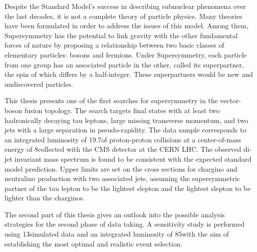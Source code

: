 Despite the Standard Model's success in describing subnuclear phenomena over the last decades, it is not a complete theory of particle physics. Many theories have been formulated in order to address the issues of this model. Among them, Supersymmetry has the potential to link gravity with the other fundamental forces of nature by proposing a relationship between two basic classes of elementary particles: bosons and fermions. Under Supersymmetry, each particle from one group has an associated particle in the other, called its superpartner, the spin of which differs by a half-integer. These superpartners would be new and undiscovered particles.

This thesis presents one of the first searches for supersymmetry in the vector-boson fusion topology. The search targets final states with at least two hadronically decaying tau leptons, large missing transverse momentum, and two jets with a large separation in pseudo-rapidity. The data sample corresponds to an integrated luminosity of 19.7\invfb of proton-proton collisions at a center-of-mass energy of 8\tev collected with the CMS detector at the CERN LHC. The observed di-jet invariant mass spectrum is found to be consistent with the expected standard model prediction. Upper limits are set on the cross sections for chargino and neutralino production with two associated jets, assuming the supersymmetric partner of the tau lepton to be the lightest slepton and the lightest slepton to be lighter than the charginos.

The second part of this thesis gives an outlook into the possible analysis strategies for the second phase of data taking. A sensitivity study is performed using 13\tev simulated data and an integrated luminosity of 85\invfb with the aim of establishing the most optimal and realistic event selection.
